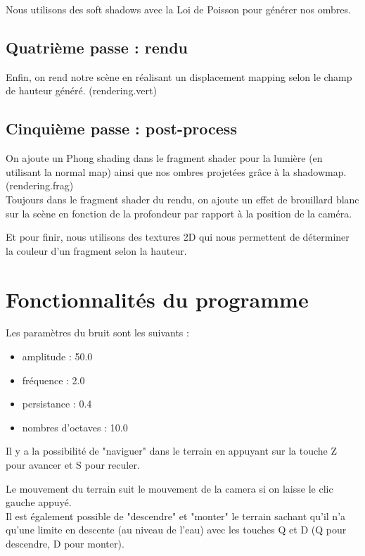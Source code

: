 \documentclass{article}
\begin{document}
Nous utilisons des soft shadows avec la Loi de Poisson pour générer nos ombres.\\

\subsection{Quatrième passe : rendu}
Enfin, on rend notre scène en réalisant un displacement mapping selon le champ de hauteur généré. (rendering.vert)

\subsection{Cinquième passe : post-process}

On ajoute un Phong shading dans le fragment shader pour la lumière (en utilisant la normal map) ainsi que nos ombres projetées grâce à la shadowmap. (rendering.frag)\\

Toujours dans le fragment shader du rendu, on ajoute un effet de brouillard blanc sur la scène en fonction de la profondeur par rapport à la position de la caméra.

Et pour finir, nous utilisons des textures 2D qui nous permettent de déterminer la couleur d'un fragment selon la hauteur.

\section{Fonctionnalités du programme}

Les paramètres du bruit sont les suivants :
\begin{itemize}
	\item amplitude : 50.0
	\item fréquence : 2.0
	\item persistance : 0.4
	\item nombres d'octaves : 10.0
\end{itemize}

Il y a la possibilité de "naviguer" dans le terrain en appuyant sur la touche Z pour avancer et S pour reculer.

Le mouvement du terrain suit le mouvement de la camera si on laisse le clic gauche appuyé.\\

Il est également possible de "descendre" et "monter" le terrain sachant qu'il n'a qu'une limite en descente (au niveau de l'eau) avec les touches Q et D (Q pour descendre, D pour monter).\\
\end{document}
